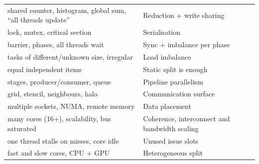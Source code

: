 \begin{longtable}{L{4.2cm}L{5.5cm}L{6.0cm}}
shared counter, histogram, global sum, ``all threads update'' & Reduction + write sharing &     \\
lock, mutex, critical section & Serialisation &    \\
barrier, phases, all threads wait & Sync + imbalance per phase &   \\
tasks of different/unknown size, irregular & Load imbalance &   \\
equal independent items & Static split is enough &  \\
stages, producer/consumer, queue & Pipeline parallelism &   \\
grid, stencil, neighbours, halo & Communication surface &    \\
multiple sockets, NUMA, remote memory & Data placement &   \\
many cores (16+), scalability, bus saturated & Coherence, interconnect and bandwidth scaling &     \\
one thread stalls on misses, core idle & Unused issue slots &    \\
fast and slow cores, CPU + GPU & Heterogeneous split &     \\
\bottomrule
\end{longtable}
\normalsize

